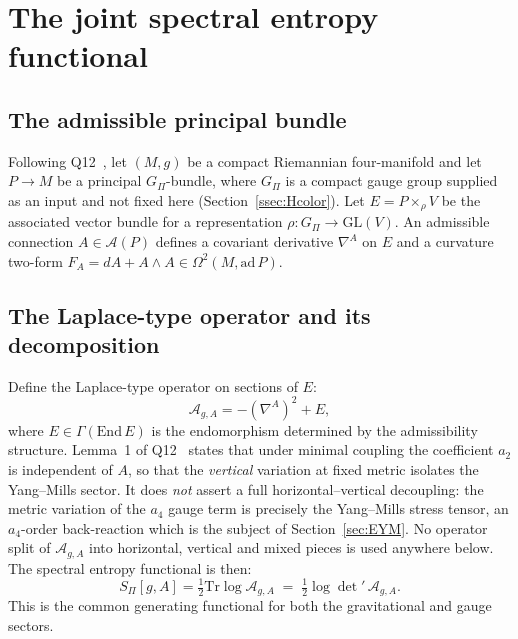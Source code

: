 \documentclass[12pt,a4paper]{article}
\theoremstyle{remark}
\begin{document}
      \clearpage
  \section{The joint spectral entropy functional}
    \label{sec:joint}

    \subsection{The admissible principal bundle}
      \label{ssec:bundle}

      Following Q12~\cite{Beau2026q12}, let $(M,g)$ be a compact Riemannian four-manifold
      and let $P\to M$ be a principal $G_\Pi$-bundle, where $G_\Pi$ is a compact gauge group
      supplied as an input and not fixed here (Section~\ref{ssec:Hcolor}).
      Let $E = P\times_\rho V$ be the associated vector bundle for a representation
      $\rho\colon G_\Pi\to \mathrm{GL}(V)$.
      An admissible connection $A\in\mathcal{A}(P)$ defines a covariant derivative
      $\nabla^A$ on $E$ and a curvature two-form $F_A = dA + A\wedge A\in\Omega^2(M,\mathrm{ad}\,P)$.

    \subsection{The Laplace-type operator and its decomposition}
      \label{ssec:Laplace}

      Define the Laplace-type operator on sections of $E$:
      \[
        \mathcal{A}_{g,A} = -(\nabla^A)^2 + E,
      \]
      where $E\in\Gamma(\mathrm{End}\,E)$ is the endomorphism determined by the admissibility
      structure.
      Lemma~1 of Q12~\cite{Beau2026q12} states that under minimal coupling the coefficient $a_2$
      is independent of $A$, so that the \emph{vertical} variation at fixed metric isolates the
      Yang--Mills sector.
      It does \emph{not} assert a full horizontal--vertical decoupling: the metric variation of
      the $a_4$ gauge term is precisely the Yang--Mills stress tensor, an $a_4$-order
      back-reaction which is the subject of Section~\ref{sec:EYM}.
      No operator split of $\mathcal{A}_{g,A}$ into horizontal, vertical and mixed pieces is used
      anywhere below.
      The spectral entropy functional is then:
      \[
        S_\Pi[g,A] = \tfrac{1}{2}\mathrm{Tr}\log\mathcal{A}_{g,A}
        \;=\;
        \tfrac{1}{2}\log\det'\,\mathcal{A}_{g,A}.
      \]
      This is the common generating functional for both the gravitational and gauge sectors.
\end{document}
